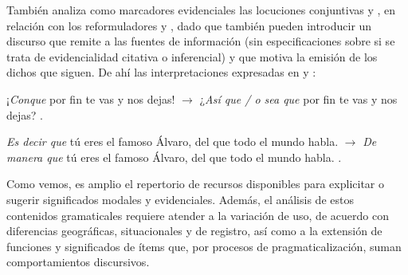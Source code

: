 También \textcite{rodriguezramalle2014} analiza como marcadores evidenciales las
locuciones conjuntivas  y , en
relación con los reformuladores  y , dado que también
pueden introducir un discurso que remite a las fuentes de información (sin
especificaciones sobre si se trata de evidencialidad citativa o inferencial) y
que motiva la emisión de los dichos que siguen. De ahí las interpretaciones
expresadas en  y :

\begin{exe}
  \ex\label{ex:14-conque}
    \begin{xlist}
      \ex ¡\textit{Conque} por fin te vas y nos dejas! $\rightarrow$ ¿\textit{Así
          que / o sea que} por fin te vas y nos dejas?
      \ex\label{ex:14-conque-b} .
    \end{xlist}
  \ex\label{ex:14-alvaro}
    \begin{xlist}
      \ex \textit{Es decir que} tú eres el famoso Álvaro, del que todo el mundo
          habla. $\rightarrow$ \textit{De manera que} tú eres el famoso Álvaro,
          del que todo el mundo habla.
      \ex\label{ex:14-alvaro-b} .
    \end{xlist}
\end{exe}

\begin{destacado}
Como vemos, es amplio el repertorio de recursos disponibles para explicitar o
sugerir significados modales y evidenciales. Además, el análisis de estos
contenidos gramaticales requiere atender a la variación de uso, de acuerdo con
diferencias geográficas, situacionales y de registro, así como a la extensión de
funciones y significados de ítems que, por procesos de pragmaticalización, suman
comportamientos discursivos.
\end{destacado}

